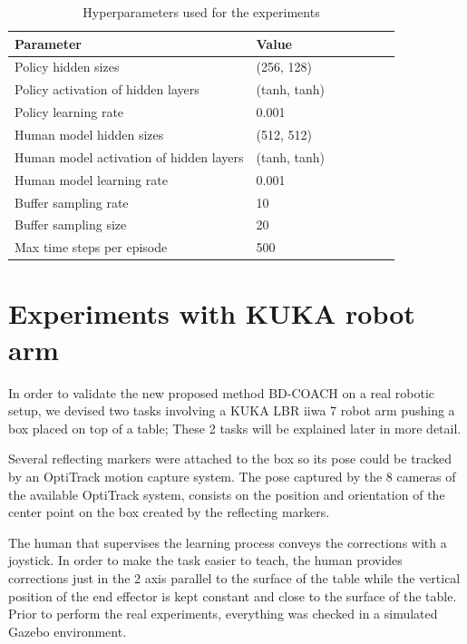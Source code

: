 \begin{table}[H]
\centering
\renewcommand{\arraystretch}{1.4}
\begin{tabular}{llS[table-format=2.2]SSS[table-format=2.2]S[table-format=2.2]}
\toprule
\textbf{Parameter }& \textbf{Value}\\[-.4em]
\midrule
Policy hidden sizes  &   (256, 128)\\
Policy activation of hidden layers  &   (tanh, tanh)\\
Policy learning rate  &  0.001\\
Human model hidden sizes &   (512, 512)\\
Human model activation of hidden layers  &   (tanh, tanh)\\
Human model learning rate  &   0.001\\
Buffer sampling rate&   10\\
Buffer sampling size &   20\\
Max time steps per episode &   500\\
\bottomrule
\end{tabular}
\caption{Hyperparameters used for the experiments}
\label{tab:hyperparameters}
\end{table}



\section{Experiments with KUKA robot arm}
\label{section:Experiments with KUKA robot arm}

In order to validate the new proposed method BD-COACH on a real robotic setup, we devised two tasks involving a KUKA LBR iiwa 7 robot arm pushing a box placed on top of a table; These 2 tasks will be explained later in more detail.

Several reflecting markers were attached to the box so its pose could be tracked by an OptiTrack motion capture system. The pose captured by the 8 cameras of the available OptiTrack system, consists on the position and orientation of the center point on the box created by the reflecting markers. 

The human that supervises the learning process conveys the corrections with a joystick. In order to make the task easier to teach, the human provides corrections just in the 2 axis parallel to the surface of the table while the vertical position of the end effector is kept constant and close to the surface of the table. Prior to perform the real experiments, everything was checked in a simulated Gazebo environment.

